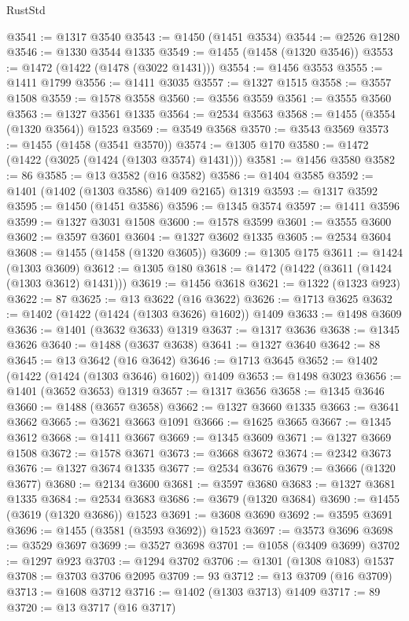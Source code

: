 \begin{lexlean}{RustStd}
\begin{coremodule}
@3541 := @1317 @3540
@3543 := @1450 (@1451 @3534)
@3544 := @2526 @1280
@3546 := @1330 @3544 @1335
@3549 := @1455 (@1458 (@1320 @3546))
@3553 := @1472 (@1422 (@1478 (@3022 @1431)))
@3554 := @1456 @3553
@3555 := @1411 @1799
@3556 := @1411 @3035
@3557 := @1327 @1515
@3558 := @3557 @1508
@3559 := @1578 @3558
@3560 := @3556 @3559
@3561 := @3555 @3560
@3563 := @1327 @3561 @1335
@3564 := @2534 @3563
@3568 := @1455 (@3554 (@1320 @3564)) @1523
@3569 := @3549 @3568
@3570 := @3543 @3569
@3573 := @1455 (@1458 (@3541 @3570))
@3574 := @1305 @170
@3580 := @1472 (@1422 (@3025 (@1424 (@1303 @3574) @1431)))
@3581 := @1456 @3580
@3582 := 86
@3585 := @13 @3582 (@16 @3582)
@3586 := @1404 @3585
@3592 := @1401 (@1402 (@1303 @3586) @1409 @2165) @1319
@3593 := @1317 @3592
@3595 := @1450 (@1451 @3586)
@3596 := @1345 @3574
@3597 := @1411 @3596
@3599 := @1327 @3031 @1508
@3600 := @1578 @3599
@3601 := @3555 @3600
@3602 := @3597 @3601
@3604 := @1327 @3602 @1335
@3605 := @2534 @3604
@3608 := @1455 (@1458 (@1320 @3605))
@3609 := @1305 @175
@3611 := @1424 (@1303 @3609)
@3612 := @1305 @180
@3618 := @1472 (@1422 (@3611 (@1424 (@1303 @3612) @1431)))
@3619 := @1456 @3618
@3621 := @1322 (@1323 @923)
@3622 := 87
@3625 := @13 @3622 (@16 @3622)
@3626 := @1713 @3625
@3632 := @1402 (@1422 (@1424 (@1303 @3626) @1602)) @1409
@3633 := @1498 @3609
@3636 := @1401 (@3632 @3633) @1319
@3637 := @1317 @3636
@3638 := @1345 @3626
@3640 := @1488 (@3637 @3638)
@3641 := @1327 @3640
@3642 := 88
@3645 := @13 @3642 (@16 @3642)
@3646 := @1713 @3645
@3652 := @1402 (@1422 (@1424 (@1303 @3646) @1602)) @1409
@3653 := @1498 @3023
@3656 := @1401 (@3652 @3653) @1319
@3657 := @1317 @3656
@3658 := @1345 @3646
@3660 := @1488 (@3657 @3658)
@3662 := @1327 @3660 @1335
@3663 := @3641 @3662
@3665 := @3621 @3663 @1091
@3666 := @1625 @3665
@3667 := @1345 @3612
@3668 := @1411 @3667
@3669 := @1345 @3609
@3671 := @1327 @3669 @1508
@3672 := @1578 @3671
@3673 := @3668 @3672
@3674 := @2342 @3673
@3676 := @1327 @3674 @1335
@3677 := @2534 @3676
@3679 := @3666 (@1320 @3677)
@3680 := @2134 @3600
@3681 := @3597 @3680
@3683 := @1327 @3681 @1335
@3684 := @2534 @3683
@3686 := @3679 (@1320 @3684)
@3690 := @1455 (@3619 (@1320 @3686)) @1523
@3691 := @3608 @3690
@3692 := @3595 @3691
@3696 := @1455 (@3581 (@3593 @3692)) @1523
@3697 := @3573 @3696
@3698 := @3529 @3697
@3699 := @3527 @3698
@3701 := @1058 (@3409 @3699)
@3702 := @1297 @923
@3703 := @1294 @3702
@3706 := @1301 (@1308 @1083) @1537
@3708 := @3703 @3706 @2095
@3709 := 93
@3712 := @13 @3709 (@16 @3709)
@3713 := @1608 @3712
@3716 := @1402 (@1303 @3713) @1409
@3717 := 89
@3720 := @13 @3717 (@16 @3717)

\end{coremodule}
\end{lexlean}
